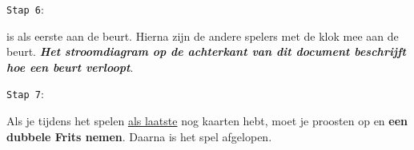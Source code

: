 \noindent
\begin{minipage}[t]{.09\textwidth}
\texttt{Stap 6}:
\end{minipage}
\hfill
\begin{minipage}[t]{.91\textwidth}
\Willem is als eerste aan de beurt. Hierna zijn de andere spelers met de klok mee aan de beurt. \textbf{\textit{Het stroomdiagram op de achterkant van dit document beschrijft hoe een beurt verloopt}}. \\
\end{minipage}

\noindent
\begin{minipage}[t]{.09\textwidth}
\texttt{Stap 7}:
\end{minipage}
\hfill
\begin{minipage}[t]{.91\textwidth}
Als je tijdens het spelen \ul{als laatste} nog kaarten hebt, moet je proosten op  en \textbf{een dubbele Frits nemen}. Daarna is het spel afgelopen.  \\
\end{minipage}





